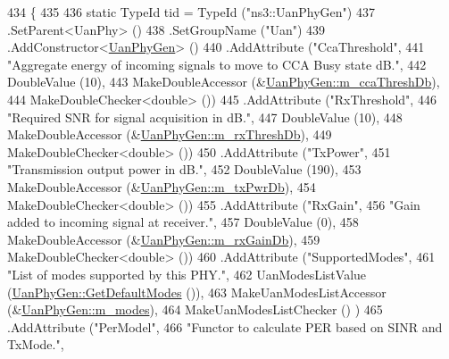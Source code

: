 \begin{DoxyCode}
434 \{
435 
436   \textcolor{keyword}{static} TypeId tid = TypeId (\textcolor{stringliteral}{"ns3::UanPhyGen"})
437     .SetParent<UanPhy> ()
438     .SetGroupName (\textcolor{stringliteral}{"Uan"})
439     .AddConstructor<\hyperlink{classns3_1_1UanPhyGen_a233a0cade16f6fa26fb85ff8438adc70}{UanPhyGen}> ()
440     .AddAttribute (\textcolor{stringliteral}{"CcaThreshold"},
441                    \textcolor{stringliteral}{"Aggregate energy of incoming signals to move to CCA Busy state dB."},
442                    DoubleValue (10),
443                    MakeDoubleAccessor (&\hyperlink{classns3_1_1UanPhyGen_a72db86114a294c5c5678eabbbdc996f9}{UanPhyGen::m\_ccaThreshDb}),
444                    MakeDoubleChecker<double> ())
445     .AddAttribute (\textcolor{stringliteral}{"RxThreshold"},
446                    \textcolor{stringliteral}{"Required SNR for signal acquisition in dB."},
447                    DoubleValue (10),
448                    MakeDoubleAccessor (&\hyperlink{classns3_1_1UanPhyGen_a6ec1e85d014bee5481cee7882ded946c}{UanPhyGen::m\_rxThreshDb}),
449                    MakeDoubleChecker<double> ())
450     .AddAttribute (\textcolor{stringliteral}{"TxPower"},
451                    \textcolor{stringliteral}{"Transmission output power in dB."},
452                    DoubleValue (190),
453                    MakeDoubleAccessor (&\hyperlink{classns3_1_1UanPhyGen_a8d21ce8d4968ac89d118da47530f7428}{UanPhyGen::m\_txPwrDb}),
454                    MakeDoubleChecker<double> ())
455     .AddAttribute (\textcolor{stringliteral}{"RxGain"},
456                    \textcolor{stringliteral}{"Gain added to incoming signal at receiver."},
457                    DoubleValue (0),
458                    MakeDoubleAccessor (&\hyperlink{classns3_1_1UanPhyGen_ac90a5f64e1ac71bd0ea8b0a75e368dd0}{UanPhyGen::m\_rxGainDb}),
459                    MakeDoubleChecker<double> ())
460     .AddAttribute (\textcolor{stringliteral}{"SupportedModes"},
461                    \textcolor{stringliteral}{"List of modes supported by this PHY."},
462                    UanModesListValue (\hyperlink{classns3_1_1UanPhyGen_a6b3ea9cb37436baa774cd2c9e9852376}{UanPhyGen::GetDefaultModes} ()),
463                    MakeUanModesListAccessor (&\hyperlink{classns3_1_1UanPhyGen_afbefa28eede3c14460aa7d69961de317}{UanPhyGen::m\_modes}),
464                    MakeUanModesListChecker () )
465     .AddAttribute (\textcolor{stringliteral}{"PerModel"},
466                    \textcolor{stringliteral}{"Functor to calculate PER based on SINR and TxMode."},

\end{DoxyCode}
